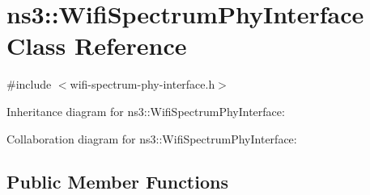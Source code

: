 \hypertarget{classns3_1_1WifiSpectrumPhyInterface}{}\section{ns3\+:\+:Wifi\+Spectrum\+Phy\+Interface Class Reference}
\label{classns3_1_1WifiSpectrumPhyInterface}


{\ttfamily \#include $<$wifi-\/spectrum-\/phy-\/interface.\+h$>$}



Inheritance diagram for ns3\+:\+:Wifi\+Spectrum\+Phy\+Interface\+:


Collaboration diagram for ns3\+:\+:Wifi\+Spectrum\+Phy\+Interface\+:
\subsection*{Public Member Functions}
